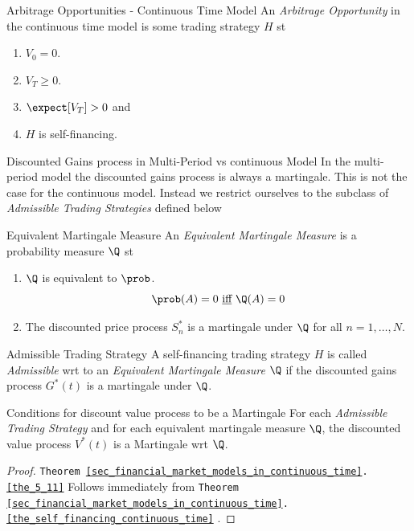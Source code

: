 \documentclass[11pt,a4paper]{article}
\begin{document}
  \begin{definition}{Arbitrage Opportunities - Continuous Time Model}
    An \textit{Arbitrage Opportunity} in the continuous time model is some trading strategy $H$ st
    \begin{enumerate}
      \item $V_0=0$.
      \item $V_T\geq0$.
      \item $\expect[V_T]>0$ and
      \item $H$ is self-financing.
    \end{enumerate}
  \end{definition}

  \begin{remark}{Discounted Gains process in Multi-Period vs continuous Model}
    In the multi-period model the discounted gains process is always a martingale. This is not the case for the continuous model. Instead we restrict ourselves to the subclass of \textit{Admissible Trading Strategies} defined below
  \end{remark}

  \begin{definition}{Equivalent Martingale Measure}
    An \textit{Equivalent Martingale Measure} is a probability measure $\Q$ st
    \begin{enumerate}
      \item $\Q$ is equivalent to $\prob$.
      \[ \prob(A)=0\text{ \underline{iff} }\Q(A)=0 \]
      \item The discounted price process $S_n^*$ is a martingale under $\Q$ for all $n=1,\dots,N$.
    \end{enumerate}
  \end{definition}

  \begin{definition}{Admissible Trading Strategy}
    A self-financing trading strategy $H$ is called \textit{Admissible} wrt to an \textit{Equivalent Martingale Measure} $\Q$ if the discounted gains process $G^*(t)$ is a martingale under $\Q$.
  \end{definition}

  \begin{theorem}{Conditions for discount value process to be a Martingale}\label{the_5_11}
    For each \textit{Admissible Trading Strategy} and for each equivalent martingale measure $\Q$, the discounted value process $V^*(t)$ is a Martingale wrt $\Q$.
  \end{theorem}

  \begin{proof}{\texttt{Theorem \ref{sec_financial_market_models_in_continuous_time}.\ref{the_5_11}} }
    Follows immediately from \texttt{Theorem \ref{sec_financial_market_models_in_continuous_time}.\ref{the_self_financing_continuous_time}} .
  \end{proof}
\end{document}
